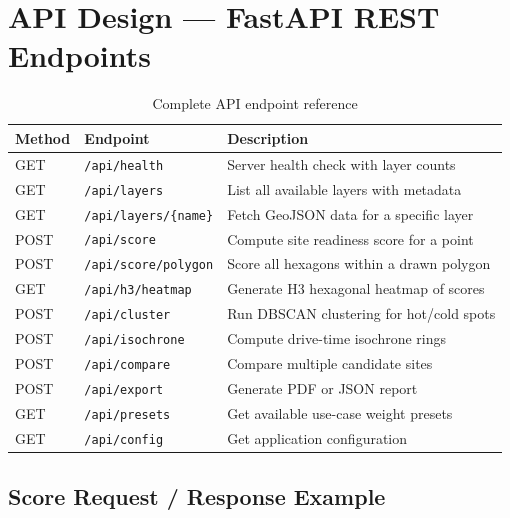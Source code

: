 \documentclass[12pt, a4paper]{article}
\begin{document}
\newpage

\section{API Design — FastAPI REST Endpoints}

\begin{table}[H]
\centering
\begin{tabularx}{\textwidth}{l l X}
    \toprule
    \textbf{Method} & \textbf{Endpoint} & \textbf{Description} \\
    \midrule
    GET  & \texttt{/api/health}         & Server health check with layer counts \\
    GET  & \texttt{/api/layers}         & List all available layers with metadata \\
    GET  & \texttt{/api/layers/\{name\}} & Fetch GeoJSON data for a specific layer \\
    POST & \texttt{/api/score}          & Compute site readiness score for a point \\
    POST & \texttt{/api/score/polygon}  & Score all hexagons within a drawn polygon \\
    GET  & \texttt{/api/h3/heatmap}     & Generate H3 hexagonal heatmap of scores \\
    POST & \texttt{/api/cluster}        & Run DBSCAN clustering for hot/cold spots \\
    POST & \texttt{/api/isochrone}      & Compute drive-time isochrone rings \\
    POST & \texttt{/api/compare}        & Compare multiple candidate sites \\
    POST & \texttt{/api/export}         & Generate PDF or JSON report \\
    GET  & \texttt{/api/presets}        & Get available use-case weight presets \\
    GET  & \texttt{/api/config}         & Get application configuration \\
    \bottomrule
\end{tabularx}
\caption{Complete API endpoint reference}
\end{table}

\subsection{Score Request / Response Example}
\end{document}
